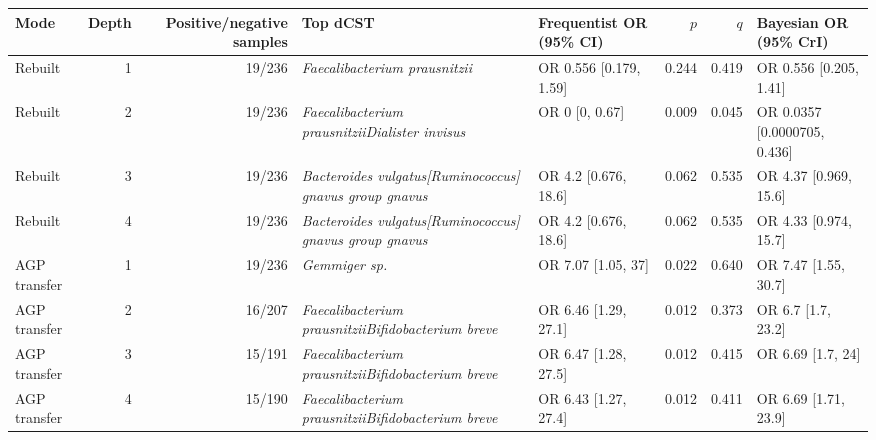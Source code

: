 \begin{center}
\scriptsize
\begin{tabularx}{\textwidth}{@{} l r r Y Y r r Y @{}}
\toprule
Mode & Depth & Positive/negative samples & Top dCST & Frequentist OR (95\% CI) & \(p\) & \(q\) & Bayesian OR (95\% CrI) \\
\midrule
Rebuilt & 1 & 19/236 & \emph{Faecalibacterium prausnitzii} & OR 0.556 [0.179, 1.59] & 0.244 & 0.419 & OR 0.556 [0.205, 1.41] \\
Rebuilt & 2 & 19/236 & \emph{Faecalibacterium prausnitzii}\dcstsep \emph{Dialister invisus} & OR 0 [0, 0.67] & 0.009 & 0.045 & OR 0.0357 [0.0000705, 0.436] \\
Rebuilt & 3 & 19/236 & \emph{Bacteroides vulgatus}\dcstsep \emph{[Ruminococcus] gnavus group gnavus} & OR 4.2 [0.676, 18.6] & 0.062 & 0.535 & OR 4.37 [0.969, 15.6] \\
Rebuilt & 4 & 19/236 & \emph{Bacteroides vulgatus}\dcstsep \emph{[Ruminococcus] gnavus group gnavus} & OR 4.2 [0.676, 18.6] & 0.062 & 0.535 & OR 4.33 [0.974, 15.7] \\
AGP transfer & 1 & 19/236 & \emph{Gemmiger sp.} & OR 7.07 [1.05, 37] & 0.022 & 0.640 & OR 7.47 [1.55, 30.7] \\
AGP transfer & 2 & 16/207 & \emph{Faecalibacterium prausnitzii}\dcstsep \emph{Bifidobacterium breve} & OR 6.46 [1.29, 27.1] & 0.012 & 0.373 & OR 6.7 [1.7, 23.2] \\
AGP transfer & 3 & 15/191 & \emph{Faecalibacterium prausnitzii}\dcstsep \emph{Bifidobacterium breve} & OR 6.47 [1.28, 27.5] & 0.012 & 0.415 & OR 6.69 [1.7, 24] \\
AGP transfer & 4 & 15/190 & \emph{Faecalibacterium prausnitzii}\dcstsep \emph{Bifidobacterium breve} & OR 6.43 [1.27, 27.4] & 0.012 & 0.411 & OR 6.69 [1.71, 23.9] \\
\bottomrule
\end{tabularx}
\end{center}
\bigskip

